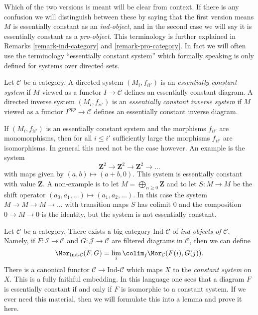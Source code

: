 \noindent
Which of the two versions is meant will be clear from context. If there is
any confusion we will distinguish between these by saying that the first
version means $M$ is essentially constant as an {\it ind-object}, and in
the second case we will say it is essentially constant as a {\it pro-object}.
This terminology is further explained in
Remarks \ref{remark-ind-category} and \ref{remark-pro-category}.
In fact we will often use the terminology ``essentially constant system''
which formally speaking is only defined for systems over directed sets.

\begin{definition}
\label{definition-essentially-constant-system}
Let $\mathcal{C}$ be a category. A directed system
$(M_i, f_{ii'})$ is an {\it essentially constant system}
if $M$ viewed as a functor $I \to \mathcal{C}$
defines an essentially constant diagram. A directed inverse system
$(M_i, f_{ii'})$ is an {\it essentially constant inverse system} if
$M$ viewed as a functor $I^{opp} \to \mathcal{C}$ defines an
essentially constant inverse diagram.
\end{definition}

\noindent
If $(M_i, f_{ii'})$ is an essentially constant system and the morphisms
$f_{ii'}$ are monomorphisms, then for all $i \leq i'$ sufficiently large the
morphisms $f_{ii'}$ are isomorphisms. In general this need not be the
case however. An example is the system
$$
\mathbf{Z}^2 \to \mathbf{Z}^2 \to \mathbf{Z}^2 \to \ldots
$$
with maps given by $(a, b) \mapsto (a + b, 0)$. This system is essentially
constant with value $\mathbf{Z}$. A non-example is to let
$M = \bigoplus_{n \geq 0} \mathbf{Z}$ and to let $S : M \to M$ be the
shift operator $(a_0, a_1, \ldots) \mapsto (a_1, a_2, \ldots)$. In this
case the system $M \to M \to M \to \ldots$ with transition maps $S$
has colimit $0$ and the composition $0 \to M \to 0$ is the identity,
but the system is not essentially constant.

\begin{remark}
\label{remark-ind-category}
Let $\mathcal{C}$ be a category. There exists a big category
$\text{Ind-}\mathcal{C}$ of {\it ind-objects of} $\mathcal{C}$.
Namely, if $F : \mathcal{I} \to \mathcal{C}$ and
$G : \mathcal{J} \to \mathcal{C}$ are filtered diagrams in $\mathcal{C}$,
then we can define
$$
\Mor_{\text{Ind-}\mathcal{C}}(F, G) =
\lim_i \colim_j \Mor_\mathcal{C}(F(i), G(j)).
$$
There is a canonical functor $\mathcal{C} \to \text{Ind-}\mathcal{C}$
which maps $X$ to the {\it constant system} on $X$. This is a fully
faithful embedding. In this language one sees that a diagram $F$ is
essentially constant if and only if $F$ is isomorphic to a constant system.
If we ever need this material, then we will formulate this into a lemma
and prove it here.
\end{remark}

